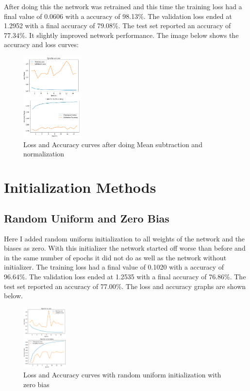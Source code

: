 \documentclass[conference]{IEEEtran}
\begin{document}
    After doing this the network was retrained and this time the
    training loss had a final value of 0.0606 with a accuracy of 98.13\%. The validation loss
    ended at 1.2952 with a final accuracy of 79.08\%. The test set reported an accuracy of 77.34\%.
    It slightly improved network performance. The image below shows the accuracy and loss curves:

    \begin{figure}[H]
        \centering
        \captionsetup{justification=centering}
        \centering
            \includegraphics[width=0.28\textwidth]{7.png}
            \caption{Loss and Accuracy curves after doing Mean subtraction and normalization}
    \end{figure}

    \section{Initialization Methods}

    \subsection{Random Uniform and Zero Bias}

    Here I added random uniform initialization to all weights of the network and the biases as zero. With this initializer
    the network started off worse than before and in the same number of epochs it did not do as well as the network without
    initializer. The training loss had a final value of 0.1020 with a accuracy of 96.64\%. The validation loss
    ended at 1.2535 with a final accuracy of 76.86\%. The test set reported an accuracy of 77.00\%. The loss and accuracy
    graphs are shown below.
    
    \begin{figure}[H]
        \centering
        \captionsetup{justification=centering}
        \centering
            \includegraphics[width=0.21\textwidth]{8.png}
            \caption{Loss and Accuracy curves with random uniform initialization with zero bias}
    \end{figure}
\end{document}
